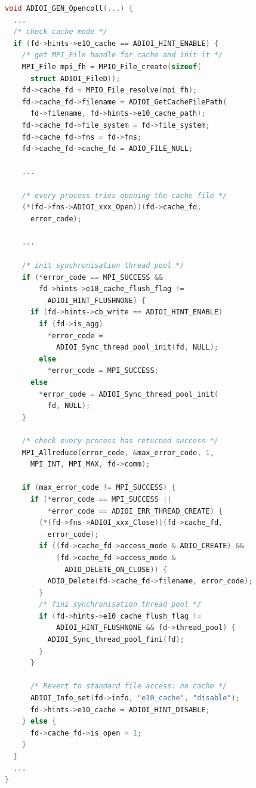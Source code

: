 \begin{lstlisting}[language=C, caption=Synchronisation Thread Initialisation, label={list: open-coll}]
void ADIOI_GEN_Opencoll(...) {
  ...
  /* check cache mode */
  if (fd->hints->e10_cache == ADIOI_HINT_ENABLE) {
    /* get MPI_File handle for cache and init it */
    MPI_File mpi_fh = MPIO_File_create(sizeof(
      struct ADIOI_FileD));
    fd->cache_fd = MPIO_File_resolve(mpi_fh);
    fd->cache_fd->filename = ADIOI_GetCacheFilePath(
      fd->filename, fd->hints->e10_cache_path);
    fd->cache_fd->file_system = fd->file_system;
    fd->cache_fd->fns = fd->fns;
    fd->cache_fd->cache_fd = ADIO_FILE_NULL;

    ...

    /* every process tries opening the cache file */
    (*(fd->fns->ADIOI_xxx_Open))(fd->cache_fd,
      error_code);

    ...

    /* init synchronisation thread pool */
    if (*error_code == MPI_SUCCESS && 
        fd->hints->e10_cache_flush_flag != 
          ADIOI_HINT_FLUSHNONE) {
      if (fd->hints->cb_write == ADIOI_HINT_ENABLE)
        if (fd->is_agg)
          *error_code = 
            ADIOI_Sync_thread_pool_init(fd, NULL);
        else
          *error_code = MPI_SUCCESS;
      else
        *error_code = ADIOI_Sync_thread_pool_init(
          fd, NULL);
    }

    /* check every process has returned success */
    MPI_Allreduce(error_code, &max_error_code, 1, 
      MPI_INT, MPI_MAX, fd->comm);

    if (max_error_code != MPI_SUCCESS) {
      if (*error_code == MPI_SUCCESS ||
          *error_code == ADIOI_ERR_THREAD_CREATE) {
        (*(fd->fns->ADIOI_xxx_Close))(fd->cache_fd,
          error_code);
        if ((fd->cache_fd->access_mode & ADIO_CREATE) &&
            (fd->cache_fd->access_mode & 
              ADIO_DELETE_ON_CLOSE)) {
          ADIO_Delete(fd->cache_fd->filename, error_code);
        }
        /* fini synchronisation thread pool */
        if (fd->hints->e10_cache_flush_flag != 
            ADIOI_HINT_FLUSHNONE && fd->thread_pool) {
          ADIOI_Sync_thread_pool_fini(fd);
        }
      }

      /* Revert to standard file access: no cache */
      ADIOI_Info_set(fd->info, "e10_cache", "disable");
      fd->hints->e10_cache = ADIOI_HINT_DISABLE;
    } else {
      fd->cache_fd->is_open = 1;
    }
  }
  ...
}
\end{lstlisting}

